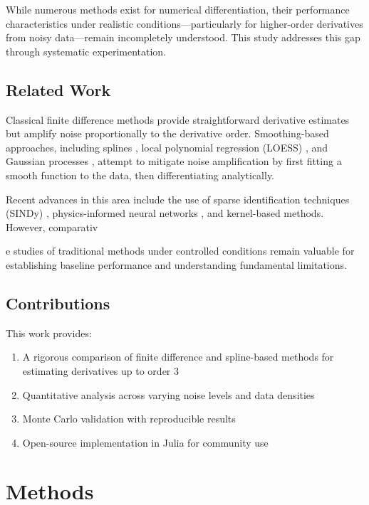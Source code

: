 \documentclass[11pt,a4paper]{article}
\begin{document}
While numerous methods exist for numerical differentiation, their performance characteristics under realistic conditions---particularly for higher-order derivatives from noisy data---remain incompletely understood. This study addresses this gap through systematic experimentation.

\subsection{Related Work}

Classical finite difference methods \cite{fornberg1988generation} provide straightforward derivative estimates but amplify noise proportionally to the derivative order. Smoothing-based approaches, including splines \cite{de1978practical}, local polynomial regression (LOESS) \cite{cleveland1979robust}, and Gaussian processes \cite{rasmussen2006gaussian}, attempt to mitigate noise amplification by first fitting a smooth function to the data, then differentiating analytically.

Recent advances in this area include the use of sparse identification techniques (SINDy) \cite{brunton2016discovering}, physics-informed neural networks \cite{raissi2019physics}, and kernel-based methods. However, comparativ

e studies of traditional methods under controlled conditions remain valuable for establishing baseline performance and understanding fundamental limitations.

\subsection{Contributions}

This work provides:
\begin{enumerate}
    \item A rigorous comparison of finite difference and spline-based methods for estimating derivatives up to order 3
    \item Quantitative analysis across varying noise levels and data densities
    \item Monte Carlo validation with reproducible results
    \item Open-source implementation in Julia for community use
\end{enumerate}

\section{Methods}
\end{document}
